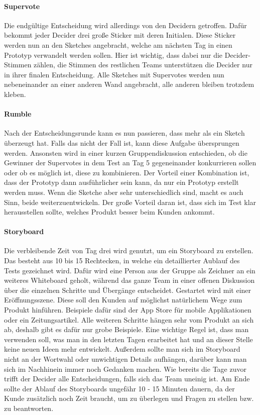 \paragraph{Supervote}
Die endgültige Entscheidung wird allerdings von den Decidern getroffen. Dafür bekommt jeder Decider drei große Sticker mit deren Initialen. Diese Sticker werden nun an den Sketches angebracht, welche am nächsten Tag in einen Prototyp verwandelt werden sollen. Hier ist wichtig, dass dabei nur die Decider-Stimmen zählen, die Stimmen des restlichen Teams unterstützen die Decider nur in ihrer finalen Entscheidung. Alle Sketches mit Supervotes werden nun nebeneinander an einer anderen Wand angebracht, alle anderen bleiben trotzdem kleben.

\paragraph{Rumble}
Nach der Entscheidungsrunde kann es nun passieren, dass mehr als ein Sketch überzeugt hat. Falls das nicht der Fall ist, kann diese Aufgabe übersprungen werden. Ansonsten wird in einer kurzen Gruppendiskussion entschieden, ob die Gewinner der Supervotes in dem Test an Tag 5 gegeneinander konkurrieren sollen oder ob es möglich ist, diese zu kombinieren. Der Vorteil einer Kombination ist, dass der Prototyp dann ausführlicher sein kann, da nur ein Prototyp erstellt werden muss. Wenn die Sketche aber sehr unterschiedlich sind, macht es auch Sinn, beide weiterzuentwickeln. Der große Vorteil daran ist, dass sich im Test klar herausstellen sollte, welches Produkt besser beim Kunden ankommt. 

\paragraph{Storyboard}
Die verbleibende Zeit von Tag drei wird genutzt, um ein Storyboard zu erstellen. Das besteht aus 10 bis 15 Rechtecken, in welche ein detaillierter Aublauf des Tests gezeichnet wird. Dafür wird eine Person aus der Gruppe als Zeichner an ein weiteres Whiteboard geholt, während das ganze Team in einer offenen Diskussion über die einzelnen Schritte und Übergänge entscheidet. Gestartet wird mit einer Eröffnungsszene. Diese soll den Kunden auf möglichst natürlichem Wege zum Produkt hinführen. Beispiele dafür sind der App Store für mobile Applikationen oder ein Zeitungsartikel. Alle weiteren Schritte hängen sehr vom Produkt an sich ab, deshalb gibt es dafür nur grobe Beispiele. Eine wichtige Regel ist, dass man verwenden soll, was man in den letzten Tagen erarbeitet hat und an dieser Stelle keine neuen Ideen mehr entwickelt. Außerdem sollte man sich im Storyboard nicht an der Wortwahl oder unwichtigen Details aufhängen, darüber kann man sich im Nachhinein immer noch Gedanken machen. Wie bereits die Tage zuvor trifft der Decider alle Entscheidungen, falls sich das Team uneinig ist. Am Ende sollte der Ablauf des Storyboards ungefähr 10 - 15 Minuten dauern, da der Kunde zusätzlich noch Zeit braucht, um zu überlegen und Fragen zu stellen bzw. zu beantworten.

